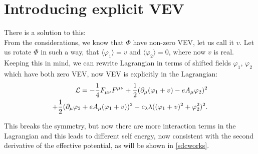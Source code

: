 \section{Introducing explicit VEV}
There is a solution to this: \\
From the \MSbar considerations, we know that $\Phi$ have non-zero VEV, let us 
call it $v$. 
Let us rotate $\Phi$ in such a way, that $\langle\varphi_1\rangle=v$ and $\langle\varphi_2\rangle 
= 0$, where now $v$ is real. \\
Keeping this in mind, we can rewrite Lagrangian in terms of shifted fields $\varphi_1$, 
$\varphi_2$ which have both zero VEV, now VEV is explicitly in the Lagrangian:
\begin{align}\label{no_mass_term}
\mathcal{L} = -\frac{1}{4}F_{\mu\nu}F^{\mu\nu}+ 
\frac{1}{2}(\partial_\mu(\varphi_1+v) - eA_\mu\varphi_2)^2\\
+\frac{1}{2}(\partial_\mu\varphi_2+eA_\mu(\varphi_1+v))^2
-c_\lambda\lambda((\varphi_1+v)^2+\varphi_2^2)^2. \notag
\end{align}

This breaks the symmetry, but now there are more interaction terms in the Lagrangian and this leads 
to different self energy, now consistent with the second derivative of the effective potential, 
as will be shown in \ref{sdcworks}.
